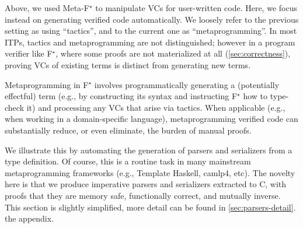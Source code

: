 \documentclass[runningheads]{llncs}
\newcommand\fstar{F$^\star$\xspace}
\newcommand\metafstar{Meta-F$^\star$\xspace}
\newcommand{\comm}[3]{\ifcheckpagebudget\else\ifdraft{{\color{#1}[#2: #3]}}\fi\fi}
\newcommand{\nik}[1]{\comm{dkpurple}{Nik}{#1}}
\newcommand{\ch}[1]{\comm{teal}{CH}{#1}}
\newcommand{\guido}[1]{\comm{blue}{Guido}{#1}}
\begin{document}
Above, we used \metafstar to manipulate VCs for user-written code.
%
Here, we focus instead on generating verified code automatically.
%
We loosely refer to the previous setting as using ``tactics'', and to
the current one as ``metaprogramming''.
%
In most ITPs, tactics and
metaprogramming are not distinguished; however in a program verifier
like \fstar, where some proofs are not materialized at
all (\autoref{sec:correctness}),
proving VCs of existing terms is distinct from generating new terms.
%


Metaprogramming in \fstar involves programmatically generating a
(potentially effectful) term (e.g., by constructing its syntax and
instructing \fstar how to type-check it) and processing any VCs
that arise via tactics. When applicable (e.g., when working
in a domain-specific language), metaprogramming verified code can
substantially reduce, or even eliminate, the burden of manual proofs.

We illustrate this by automating the generation of parsers and
serializers from a type definition. Of course, this
is a routine task in many mainstream
metaprogramming frameworks (e.g., Template Haskell, camlp4, etc). The
novelty here is that we produce imperative
parsers and serializers extracted to C, with proofs that they are memory safe,
functionally correct, and mutually inverse.
%
This section is slightly simplified, more detail can be found
\iffull
in \autoref{sec:parsers-detail}.
\else
the appendix.
\fi
\end{document}
